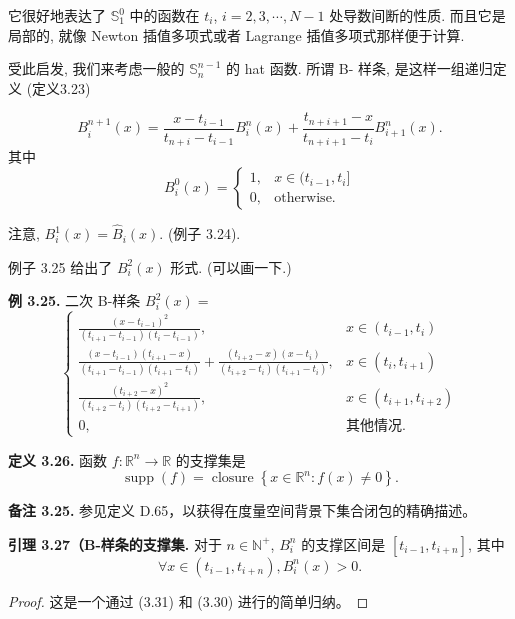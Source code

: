 \documentclass[a4paper]{ctexart}
\begin{document}
{它很好地表达了 $\mathbb{S}_1^0$ 中的函数在 $t_i$, $i = 2, 3, \cdots, N - 1$
处导数间断的性质. 而且它是局部的, 就像 Newton 插值多项式或者 Lagrange 
插值多项式那样便于计算.

受此启发, 我们来考虑一般的 $\mathbb{S}_n^{n - 1}$ 的 hat 函数. 所谓 B-
样条, 是这样一组递归定义 (定义3.23)

$$
B_i^{n + 1}(x) = \frac{x - t_{i - 1}}{t_{n + i} - t_{i - 1}} B_i^{n}(x) 
+ \frac{t_{n + i + 1} - x}{t_{n + i + 1} - t_i} B_{i + 1}^n(x).
$$
其中
$$
B_i^0(x) = \left\{
\begin{array}{rcl}
  1, & x \in (t_{i - 1}, t_i] \\
  0, & \mbox{otherwise.}
\end{array}
\right. 
$$

注意, $B_i^1(x) = \hat{B}_i(x)$. (例子 3.24).

例子 3.25 给出了 $B_i^2(x)$ 形式. (可以画一下.)

\noindent \textbf{例 3.25.} 二次 B-样条 $B_{i}^{2}(x)=$
\[
\left\{
\begin{array}{ll}
\frac{\left(x-t_{i-1}\right)^{2}}{\left(t_{i+1}-t_{i-1}\right)\left(t_{i}-t_{i-1}\right)}, & x\in\left(t_{i-1}, t_{i}\right) \\
\frac{\left(x-t_{i-1}\right)\left(t_{i+1}-x\right)}{\left(t_{i+1}-t_{i-1}\right)\left(t_{i+1}-t_{i}\right)}+\frac{\left(t_{i+2}-x\right)\left(x-t_{i}\right)}{\left(t_{i+2}-t_{i}\right)\left(t_{i+1}-t_{i}\right)}, & x\in\left(t_{i}, t_{i+1}\right) \\
\frac{\left(t_{i+2}-x\right)^{2}}{\left(t_{i+2}-t_{i}\right)\left(t_{i+2}-t_{i+1}\right)}, & x\in\left(t_{i+1}, t_{i+2}\right) \\
0, & \text{其他情况.}
\end{array}
\right.
\tag{3.33}
\]

\noindent \textbf{定义 3.26.} 函数 $f: \mathbb{R}^{n} \rightarrow \mathbb{R}$ 的支撑集是
\[
\operatorname{supp}(f)=\operatorname{closure}\left\{x\in \mathbb{R}^{n}: f(x)\neq 0\right\}.
\tag{3.34}
\]

\noindent \textbf{备注 3.25.} 参见定义 D.65，以获得在度量空间背景下集合闭包的精确描述。

\noindent \textbf{引理 3.27（B-样条的支撑集.} 对于 $n\in \mathbb{N}^{+}$, $B_{i}^{n}$ 的支撑区间是 $\left[t_{i - 1}, t_{i + n}\right]$, 其中
\[
  \forall x\in\left(t_{i-1}, t_{i+n}\right), B_{i}^{n}(x)>0.
\tag{3.35}
\]

\begin{proof}
  这是一个通过 (3.31) 和 (3.30) 进行的简单归纳。
\end{proof} 

}
\end{document}
